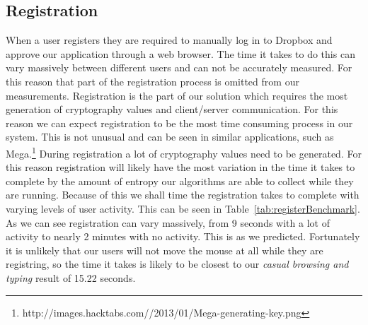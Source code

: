 \documentclass[12pt, titlepage]{article}
\begin{document}
\subsection{Registration}
When a user registers they are required to manually log in to Dropbox and approve our application through a web browser. The time it takes to do this can vary massively between different users and can not be accurately measured. For this reason that part of the registration process is omitted from our measurements. 
\newline \indent Registration is the part of our solution which requires the most generation of cryptography values and client/server communication. For this reason we can expect registration to be the most time consuming process in our system. This is not unusual and can be seen in similar applications, such as Mega.\footnote{http://images.hacktabs.com//2013/01/Mega-generating-key.png}
\newline \indent During registration a lot of cryptography values need to be generated. For this reason registration will likely have the most variation in the time it takes to complete by the amount of entropy our algorithms are able to collect while they are running. Because of this we shall time the registration takes to complete with varying levels of user activity. This can be seen in Table~\ref{tab:registerBenchmark}. As we can see registration can vary massively, from 9 seconds with a lot of activity to nearly 2 minutes with no activity. This is as we predicted. Fortunately it is unlikely that our users will not move the mouse at all while they are registring, so the time it takes is likely to be closest to our \textit{casual browsing and typing} result of 15.22 seconds.
\end{document}
